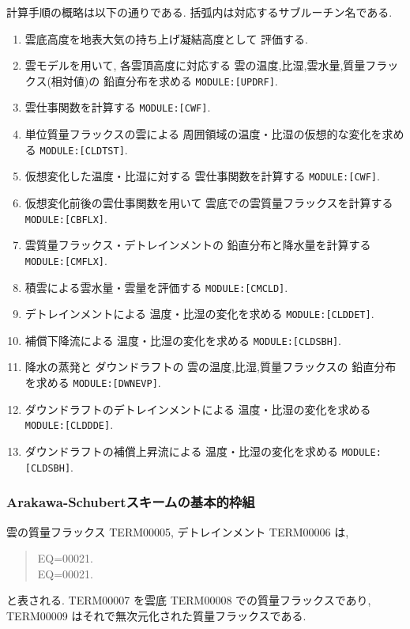 計算手順の概略は以下の通りである.
括弧内は対応するサブルーチン名である.
%
\begin{enumerate}
\item 雲底高度を地表大気の持ち上げ凝結高度として
      評価する.
\item 雲モデルを用いて, 
      各雲頂高度に対応する
      雲の温度,比湿,雲水量,質量フラックス(相対値)の
      鉛直分布を求める \texttt{MODULE:[UPDRF]}.
\item 雲仕事関数を計算する \texttt{MODULE:[CWF]}.
\item 単位質量フラックスの雲による
      周囲領域の温度・比湿の仮想的な変化を求める \texttt{MODULE:[CLDTST]}.
\item 仮想変化した温度・比湿に対する
      雲仕事関数を計算する \texttt{MODULE:[CWF]}.
\item 仮想変化前後の雲仕事関数を用いて
      雲底での雲質量フラックスを計算する \texttt{MODULE:[CBFLX]}.
\item 雲質量フラックス・デトレインメントの
      鉛直分布と降水量を計算する \texttt{MODULE:[CMFLX]}.
\item 積雲による雲水量・雲量を評価する \texttt{MODULE:[CMCLD]}.
\item デトレインメントによる
      温度・比湿の変化を求める \texttt{MODULE:[CLDDET]}.
\item 補償下降流による
      温度・比湿の変化を求める \texttt{MODULE:[CLDSBH]}.
\item 降水の蒸発と
      ダウンドラフトの
      雲の温度,比湿,質量フラックスの
      鉛直分布を求める \texttt{MODULE:[DWNEVP]}.
\item ダウンドラフトのデトレインメントによる
      温度・比湿の変化を求める \texttt{MODULE:[CLDDDE]}.      
\item ダウンドラフトの補償上昇流による
      温度・比湿の変化を求める \texttt{MODULE:[CLDSBH]}.
\end{enumerate}

\subsubsection{Arakawa-Schubertスキームの基本的枠組}

雲の質量フラックス TERM00005, デトレインメント TERM00006 は, 
\begin{quote}
EQ=00021.\\
EQ=00021.
\end{quote}
と表される. 
TERM00007 を雲底 TERM00008 での質量フラックスであり,
TERM00009 はそれで無次元化された質量フラックスである.

